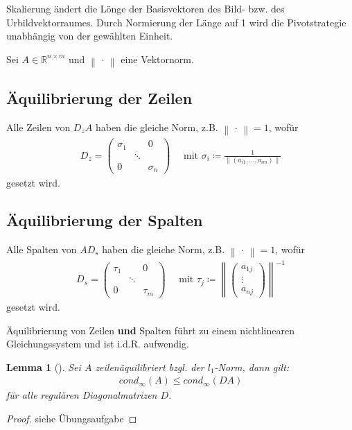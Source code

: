 \documentclass[ngerman,fontsize=11pt, paper=a4, parskip=half, titlepage=true, toc=bib]{scrbook}
\theoremstyle{definition}
\theoremstyle{plain}
\newtheorem{Lem}[Def]{Lemma}		%
\newcommand{\Renm}{\mathds{R}^{n\times m}}
\newcommand{\nn}[1]{\left\| #1 \right\|}
\newcommand{\subsectione}[1]{\addtocounter{Def}{1}\subsection{#1}}
\newenvironment{Leme}[1][]{ %
	\begin{Lem}[#1]
	}
	{
	\end{Lem}
	\addtocounter{subsection}{1}
}
\begin{document}
  Skalierung ändert die Lönge der Basisvektoren des Bild- bzw. des Urbildvektorraumes.
  Durch Normierung der Länge auf 1 wird die Pivotstrategie unabhängig von der 
  gewählten Einheit.
  
  Sei $A\in\Renm $ und $\nn{\,\cdot\,} $ eine Vektornorm.
  
  
  \subsectione{Äquilibrierung der Zeilen} 
  Alle Zeilen von $D_zA$ haben die gleiche Norm, z.B. $\nn{\,\cdot\,} =1$, wofür 
  \begin{gather}
    D_z = \begin{pmatrix}
      \sigma_1 & & 0 \\
      &\ddots & \\ 
      0 && \sigma_n
    \end{pmatrix}
    \quad \text{ mit }\sigma_i\coloneqq \frac{1}{\nn{(a_{i1}, \dots , a_{im})}}
    \label{IV.1.1}
  \end{gather}
  gesetzt wird.


\subsectione{Äquilibrierung der Spalten} 
  Alle Spalten von $AD_s$ haben die gleiche Norm, z.B. $\nn{\,\cdot\,} =1$, wofür 
  \begin{gather}
    D_s = \begin{pmatrix}
      \tau_1 & & 0 \\
      &\ddots & \\ 
      0 && \tau_m
    \end{pmatrix}
    \quad \text{ mit }\tau_j\coloneqq \nn{\begin{pmatrix}
        a_{1j} \\ \vdots \\ a_{nj}
      \end{pmatrix}}^{-1}
    \label{IV.1.2}
  \end{gather}
  gesetzt wird.
  
  Äquilibrierung von Zeilen \textbf{und} Spalten führt zu einem nichtlinearen Gleichungssystem und ist i.d.R. aufwendig.
  
  
  \begin{Leme}
  	\label{4.3.1}
  	Sei $A$ zeilenäquilibriert bzgl. der $l_1$-Norm, dann gilt:
  	\begin{gather}
  	cond_{\infty}(A) \leq cond_{\infty}(DA)  \label{IV.1.3}
  	\end{gather}
  	für alle regulären Diagonalmatrizen $D$.
  \end{Leme} 
  
  \begin{proof}
    siehe Übungsaufgabe
  \end{proof}
\end{document}
